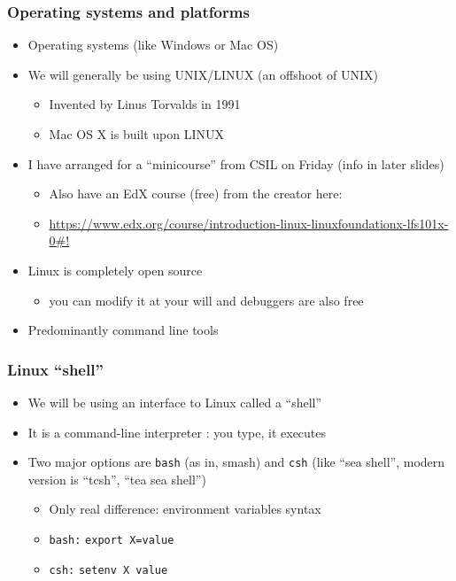 \documentclass[hyperref={colorlinks=true}]{beamer}
\begin{document}
\begin{frame}%
  \frametitle{Operating systems and platforms}
  
  \begin{itemize}
    \item Operating systems (like Windows or Mac OS)
    \item We will generally be using UNIX/LINUX (an offshoot of UNIX)
    \begin{itemize}
      \item Invented by Linus Torvalds in 1991
      \item Mac OS X is built upon LINUX
    \end{itemize}
    \item I have arranged for a ``minicourse'' from CSIL on Friday (info in later slides)
    \begin{itemize}
      \item Also have an EdX course (free) from the creator here:
      \item \url{https://www.edx.org/course/introduction-linux-linuxfoundationx-lfs101x-0\#!}
    \end{itemize}
    \item Linux is completely open source
    \begin{itemize}
      \item you can modify it at your will and debuggers are also free
    \end{itemize}
    \item Predominantly command line tools
  \end{itemize}
  
  
\end{frame}


\begin{frame}%
  \frametitle{Linux ``shell''}
  
  \begin{itemize}
    \item We will be using an interface to Linux called a ``shell''
    \item It is a command-line interpreter : you type, it executes
    \item Two major options are \texttt{bash} (as in, smash) and \texttt{csh} (like ``sea shell'', modern version is ``tcsh'', ``tea sea shell'')
    \begin{itemize}
      \item Only real difference: environment variables syntax
      \item \texttt{bash:} \texttt{export X=value}
      \item \texttt{csh:} \texttt{setenv X value}
    \end{itemize}
  \end{itemize}
  
\end{frame}
\end{document}
